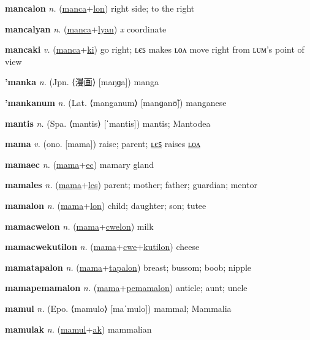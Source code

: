 \textbf{\hypertarget{mancalon}{mancalon}} \textit{n.} (\hyperlink{manca}{manca}+\allowbreak \hyperlink{lon}{lon})
right side; to the right

\textbf{\hypertarget{mancalyan}{mancalyan}} \textit{n.} (\hyperlink{manca}{manca}+\allowbreak \hyperlink{lyan}{lyan})
\textit{x} coordinate

\textbf{\hypertarget{mancaki}{mancaki}} \textit{v.} (\hyperlink{manca}{manca}+\allowbreak \hyperlink{ki}{ki})
go right; ʟєꜱ makes ʟᴏᴧ move right from ʟᴜᴍ’s point of view

\textbf{\hypertarget{'manka}{'manka}} \textit{n.} (Jpn. ⟨{\japanese{}漫画}⟩ [maŋɡa])
manga

\textbf{\hypertarget{'mankanum}{'mankanum}} \textit{n.} (Lat. ⟨manganum⟩ [manɡanʊ̃])
manganese

\textbf{\hypertarget{mantis}{mantis}} \textit{n.} (Spa. ⟨mantis⟩ [ˈmantis])
mantis; Mantodea

\textbf{\hypertarget{mama}{mama}} \textit{v.} (ono. [mama])
raise; parent; \hyperlink{mamales}{ʟєꜱ} raises \hyperlink{mamalon}{ʟᴏᴧ}

\textbf{\hypertarget{mamaec}{mamaec}} \textit{n.} (\hyperlink{mama}{mama}+\allowbreak \hyperlink{ec}{ec})
mamary gland

\textbf{\hypertarget{mamales}{mamales}} \textit{n.} (\hyperlink{mama}{mama}+\allowbreak \hyperlink{les}{les})
parent; mother; father; guardian; mentor

\textbf{\hypertarget{mamalon}{mamalon}} \textit{n.} (\hyperlink{mama}{mama}+\allowbreak \hyperlink{lon}{lon})
child; daughter; son; tutee

\textbf{\hypertarget{mamacwelon}{mamacwelon}} \textit{n.} (\hyperlink{mama}{mama}+\allowbreak \hyperlink{cwelon}{cwelon})
milk

\textbf{\hypertarget{mamacwekutilon}{mamacwekutilon}} \textit{n.} (\hyperlink{mama}{mama}+\allowbreak \hyperlink{cwe}{cwe}+\allowbreak \hyperlink{kutilon}{kutilon})
cheese

\textbf{\hypertarget{mamatapalon}{mamatapalon}} \textit{n.} (\hyperlink{mama}{mama}+\allowbreak \hyperlink{tapalon}{tapalon})
breast; bussom; boob; nipple

\textbf{\hypertarget{mamapemamalon}{mamapemamalon}} \textit{n.} (\hyperlink{mama}{mama}+\allowbreak \hyperlink{pemamalon}{pemamalon})
anticle; aunt; uncle

\textbf{\hypertarget{mamul}{mamul}} \textit{n.} (Epo. ⟨mamulo⟩ [maˈmulo])
mammal; Mammalia

\textbf{\hypertarget{mamulak}{mamulak}} \textit{n.} (\hyperlink{mamul}{mamul}+\allowbreak \hyperlink{ak}{ak})
mammalian

